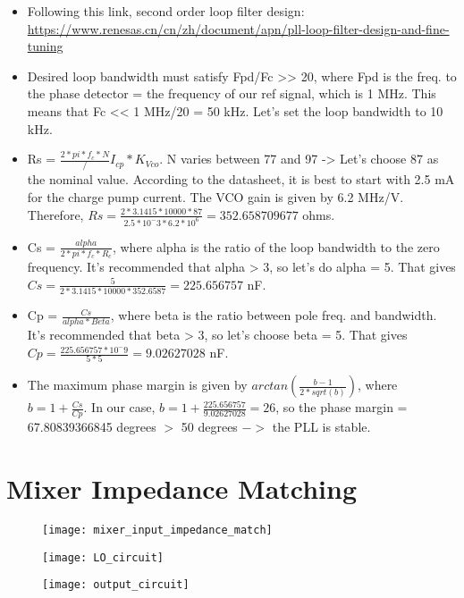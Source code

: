 \documentclass[12pt, letterpaper]{article}
\begin{document}
\begin{itemize}
    \item Following this link, second order loop filter design: \url{https://www.renesas.cn/cn/zh/document/apn/pll-loop-filter-design-and-fine-tuning}
    \item Desired loop bandwidth must satisfy Fpd/Fc >> 20, where Fpd is the freq. to the phase detector = the frequency of our ref signal, which is 1 MHz. This means that Fc << 1 MHz/20 = 50 kHz. Let's set the loop bandwidth to 10 kHz.
    \item Rs = \(\frac{2*pi*f_c*N}/{I_{cp}*K_{Vco}}\). N varies between 77 and 97 -> Let's choose 87 as the nominal value. According to the datasheet, it is best to start with 2.5 mA for the charge pump current. The VCO gain is given by 6.2 MHz/V. Therefore, \(Rs = \frac{2*3.1415*10000*87}{2.5*10^-3*6.2*10^6} = 352.658709677\) ohms. 
    \item Cs = \(\frac{alpha}{2*pi*f_c*R_c}\), where alpha is the ratio of the loop bandwidth to the zero frequency. It's recommended that alpha > 3, so let's do alpha = 5. That gives \(Cs = \frac{5}{2*3.1415*10000*352.6587} = 225.656757\) nF.
    \item Cp = \(\frac{Cs}{alpha*Beta}\), where beta is the ratio between pole freq. and bandwidth. It's recommended that beta > 3, so let's choose beta = 5. That gives \(Cp = \frac{225.656757*10^-9}{5*5} = 9.02627028\) nF.
    \item The maximum phase margin is given by \(arctan(\frac{b-1}{2*sqrt(b)})\), where \(b = 1 + \frac{Cs}{Cp}\). In our case, \(b = 1 + \frac{225.656757}{9.02627028} = 26\), so the phase margin = 67.80839366845 degrees \(>\) 50 degrees \(->\) the PLL is stable.
\end{itemize}

\section{Mixer Impedance Matching}

\begin{figure}[h]
    \texttt{[image: mixer\_input\_impedance\_match]}
\end{figure}

\begin{figure}[h]
    \texttt{[image: LO\_circuit]}
\end{figure}

\begin{figure}[h]
    \texttt{[image: output\_circuit]}
\end{figure}
\end{document}
